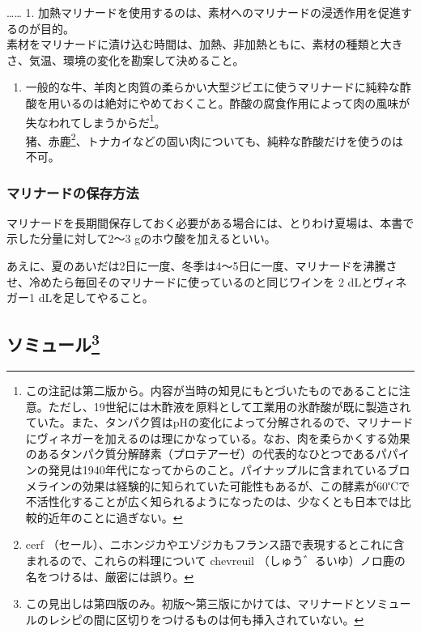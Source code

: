 \begin{recette}
\ldots{}\ldots{} 1.
加熱マリナードを使用するのは、素材へのマリナードの浸透作用を促進するのが目的。\\
素材をマリナードに漬け込む時間は、加熱、非加熱ともに、素材の種類と大きさ、気温、環境の変化を勘案して決めること。

\begin{enumerate}
\def\labelenumi{\arabic{enumi}.}
\setcounter{enumi}{1}
\tightlist
\item
  一般的な牛、羊肉と肉質の柔らかい大型ジビエに使うマリナードに純粋な酢酸を用いるのは絶対にやめておくこと。酢酸の腐食作用によって肉の風味が失なわれてしまうからだ\footnote{この注記は第二版から。内容が当時の知見にもとづいたものであることに注意。ただし、19世紀には木酢液を原料として工業用の氷酢酸が既に製造されていた。また、タンパク質はpHの変化によって分解されるので、マリナードにヴィネガーを加えるのは理にかなっている。なお、肉を柔らかくする効果のあるタンパク質分解酵素（プロテアーゼ）の代表的なひとつであるパパインの発見は1940年代になってからのこと。パイナップルに含まれているブロメラインの効果は経験的に知られていた可能性もあるが、この酵素が60℃で不活性化することが広く知られるようになったのは、少なくとも日本では比較的近年のことに過ぎない。}。\\
  猪、赤鹿\footnote{cerf
    （セール）、ニホンジカやエゾジカもフランス語で表現するとこれに含まれるので、これらの料理について
    chevreuil （しゅう゛るいゆ）ノロ鹿の名をつけるは、厳密には誤り。}、トナカイなどの固い肉についても、純粋な酢酸だけを使うのは不可。
\end{enumerate}

\hypertarget{conservation-des-marinades}{%
\subsubsection{マリナードの保存方法}\label{conservation-des-marinades}}



マリナードを長期間保存しておく必要がある場合には、とりわけ夏場は、本書で示した分量に対して2〜3
gのホウ酸を加えるといい。

あえに、夏のあいだは2日に一度、冬季は4〜5日に一度、マリナードを沸騰させ、冷めたら毎回そのマリナードに使っているのと同じワインを
2 dLとヴィネガー1 dLを足してやること。
\end{recette}
\hypertarget{saumures}{%
\subsection[ソミュール]{\texorpdfstring{ソミュール\footnote{この見出しは第四版のみ。初版〜第三版にかけては、マリナードとソミュールのレシピの間に区切りをつけるものは何も挿入されていない。}}{ソミュール}}\label{saumures}}

